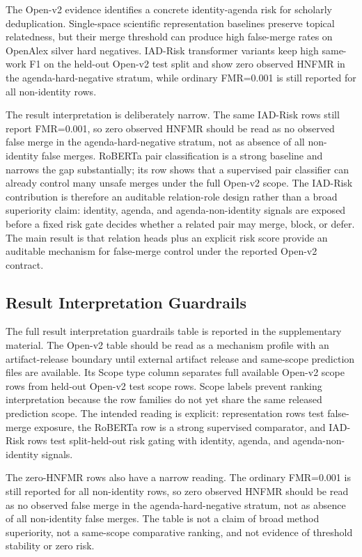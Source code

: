 \documentclass[preprint,12pt]{elsarticle}
\begin{document}
The Open-v2 evidence identifies a concrete identity-agenda risk for scholarly deduplication. Single-space scientific representation baselines preserve topical relatedness, but their merge threshold can produce high false-merge rates on OpenAlex silver hard negatives. IAD-Risk transformer variants keep high same-work F1 on the held-out Open-v2 test split and show zero observed HNFMR in the agenda-hard-negative stratum, while ordinary FMR=0.001 is still reported for all non-identity rows.

The result interpretation is deliberately narrow. The same IAD-Risk rows still report FMR=0.001, so zero observed HNFMR should be read as no observed false merge in the agenda-hard-negative stratum, not as absence of all non-identity false merges. RoBERTa pair classification is a strong baseline and narrows the gap substantially; its row shows that a supervised pair classifier can already control many unsafe merges under the full Open-v2 scope. The IAD-Risk contribution is therefore an auditable relation-role design rather than a broad superiority claim: identity, agenda, and agenda-non-identity signals are exposed before a fixed risk gate decides whether a related pair may merge, block, or defer. The main result is that relation heads plus an explicit risk score provide an auditable mechanism for false-merge control under the reported Open-v2 contract.

\subsection{Result Interpretation Guardrails}

The full result interpretation guardrails table is reported in the supplementary material. The Open-v2 table should be read as a mechanism profile with an artifact-release boundary until external artifact release and same-scope prediction files are available. Its Scope type column separates full available Open-v2 scope rows from held-out Open-v2 test scope rows. Scope labels prevent ranking interpretation because the row families do not yet share the same released prediction scope. The intended reading is explicit: representation rows test false-merge exposure, the RoBERTa row is a strong supervised comparator, and IAD-Risk rows test split-held-out risk gating with identity, agenda, and agenda-non-identity signals.

The zero-HNFMR rows also have a narrow reading. The ordinary FMR=0.001 is still reported for all non-identity rows, so zero observed HNFMR should be read as no observed false merge in the agenda-hard-negative stratum, not as absence of all non-identity false merges. The table is not a claim of broad method superiority, not a same-scope comparative ranking, and not evidence of threshold stability or zero risk.
\end{document}
